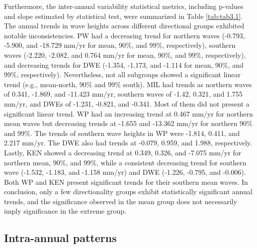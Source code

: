 Furthermore, the inter-annual variability statistical metrics, including
p-values and slope estimated by statistical test, were summarized in Table
\ref{tab:tab3.1}. The annual trends in wave heights across different directional
groups exhibited notable inconsistencies. PW had a decreasing trend for northern
waves (-0.793, -5.900, and -18.729 mm/yr for mean, 90\%, and 99\%,
respectively), southern waves (-2.220, -2.082, and 0.764 mm/yr for mean, 90\%,
and 99\%, respectively), and decreasing trends for DWE (-1.354, -1.173, and
-1.114 for mean, 90\%, and 99\%, respectively). Nevertheless, not all subgroups
showed a significant linear trend (e.g., mean-north, 90\% and 99\% south). MIL
had trends as northern waves of 0.341, -1.869, and -11.423 mm/yr, southern waves
of -1.42, 0.321, and 1.755 mm/yr, and DWEs of -1.231, -0.821, and -0.341. Most
of them did not present a significant linear trend. WP had an increasing trend
at 0.467 mm/yr for northern mean waves but decreasing trends at -1.655 and
-13.362 mm/yr for northern 90\% and 99\%. The trends of southern wave heights in
WP were -1.814, 0.411, and 2.217 mm/yr. The DWE also had trends at -0.079,
0.959, and 1.988, respectively. Lastly, KEN showed a decreasing trend at 0.349,
0.326, and -7.075 mm/yr for northern mean, 90\%, and 99\%, while a consistent
decreasing trend for southern wave (-1.532, -1.183, and -1.158 mm/yr) and DWE
(-1.226, -0.795, and -0.006). Both WP and KEN present significant trends for
their southern mean waves. In conclusion, only a few directionality groups
exhibit statistically significant annual trends, and the significance observed
in the mean group does not necessarily imply significance in the extreme group.



\subsection{Intra-annual patterns}
\label{Intra-annual patterns}

